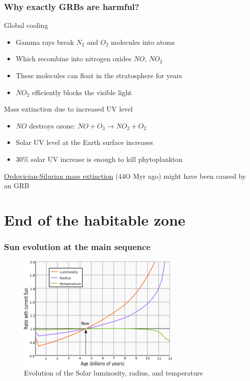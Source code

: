\documentclass[aspectratio=169]{beamer}
\begin{document}
\begin{frame}
\frametitle{Why exactly GRBs are harmful?}
\begin{block}{Global cooling}
\begin{itemize}
\item Gamma rays break $N_2$ and $O_2$ molecules into atoms
\item Which recombine into nitrogen oxides $NO$, $NO_2$
\item These molecules can float in the stratosphere for years
\item $NO_2$ efficiently blocks the visible light
\end{itemize}
\end{block}

\begin{block}{Mass extinction due to increased UV level}
\begin{itemize}
\item $NO$ destroys ozone: $NO + O_3 \to NO_2 + O_2$
\item Solar UV level at the Earth surface increases
\item 30\% solar UV increase is enough to kill phytoplankton 
\end{itemize}
\href{http://en.wikipedia.org/wiki/Ordovician\%E2\%80\%93Silurian_extinction_events}{Ordovician-Silurian mass extinction}
(44O Myr ago) might have been caused by an GRB \cite{arXiv:astro-ph/0309415}
\end{block}
\end{frame}


\section{End of the habitable zone}
\begin{frame}
\frametitle{Sun evolution at the main sequence}
\begin{figure}
\includegraphics[width=0.7\textwidth]{img/640px-Solar_evolution_(English).png}
\captionsetup{labelformat=empty}
\caption{Evolution of the Solar luminosity, radius, and temperature \cite{arXiv:0911.4872}}
\end{figure}
\end{frame}
\end{document}
